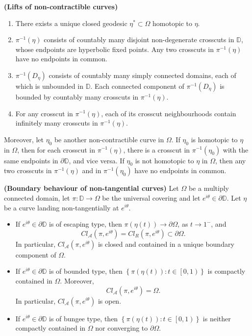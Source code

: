 \documentclass[10pt,a4paper]{amsart}
\begin{document}
\begin{lemma}{\bf (Lifts of non-contractible curves)}
\begin{enumerate}[label={\em (\alph*)}]
				\begin{enumerate}[label={\em c.\arabic*}]
			\item There exists a unique closed geodesic $\eta^*\subset\Omega$ homotopic to $\eta$.
			\item $ \pi^{-1}(\eta) $ consists of  countably many disjoint non-degenerate crosscuts in $ \mathbb{D} $, whose endpoints are hyperbolic fixed points. Any two crosscuts in $ \pi^{-1}(\eta) $ have no endpoints in common.
			\item $ \pi^{-1}(D_\eta) $ consists of countably many simply connected domains, each of which is unbounded in $ \mathbb{D} $. Each connected component of $ \pi^{-1}(D_\eta) $ is bounded by countably many crosscuts in $ \pi^{-1}(\eta) $.
			\item For any crosscut in $ \pi^{-1}(\eta) $, each of its crosscut neighbourhoods contain infinitely many crosscuts in $ \pi^{-1}(\eta) $.
		\end{enumerate}
	\end{enumerate}

\noindent Moreover, let $ \eta_0 $ be another non-contractible curve in $ \Omega $. If $ \eta_0 $ is homotopic to $ \eta $ in $ \Omega $,  then for each crosscut in $ \pi^{-1}(\eta) $, there is a crosscut in $ \pi^{-1}(\eta_0) $  with the same endpoints in $ \partial\mathbb{D} $, and vice versa. If $ \eta_0 $ is not homotopic to $ \eta $ in $ \Omega $, then any two crosscuts in $ \pi^{-1}(\eta) $ and in $ \pi^{-1}(\eta_0) $ have no endpoints in common.
\end{lemma}

\begin{prop}{\bf (Boundary behaviour of non-tangential curves)}\label{prop-escaping-bounded-bungee}	Let $ \Omega $ be a multiply connected domain,  let $ \pi\colon\mathbb{D}\to \Omega $ be the universal covering and let $ e^{i\theta}\in\partial\mathbb{D} $. 
	Let $ \eta $ be a curve landing non-tangentially at $ e^{i\theta}$.
		\begin{itemize}
		\item  If $ e^{i\theta}\in\partial \mathbb{D} $ is of {escaping} type, then $ \pi(\eta (t))\to\partial \Omega $, as $ t\to 1^{-} $, and
		\[ Cl_{\mathcal{A}}(\pi, e^{i\theta})= Cl_{R}(\pi, e^{i\theta})\subset \partial \Omega. \] In particular, $ Cl_{\mathcal{A}}(\pi, e^{i\theta}) $ is closed and contained in a unique boundary component of $\Omega$.
		\item If  $ e^{i\theta}\in\partial \mathbb{D} $ is of bounded type, then $\left\lbrace  \pi(\eta (t))\colon t\in \left[ 0,1\right) \right\rbrace  $ is compactly contained in $ \Omega $. Moreover,
		\[ Cl_{\mathcal{A}}(\pi, e^{i\theta})=  \Omega. \] In particular, $ Cl_{\mathcal{A}}(\pi, e^{i\theta}) $ is open.
		\item If $ e^{i\theta}\in\partial \mathbb{D} $ is of {bungee} type, then $\left\lbrace  \pi(\eta (t))\colon t\in \left[ 0,1\right) \right\rbrace  $ is neither compactly contained in $ \Omega $ nor converging to $ \partial \Omega $.
	\end{itemize}
\end{prop}
\end{document}
